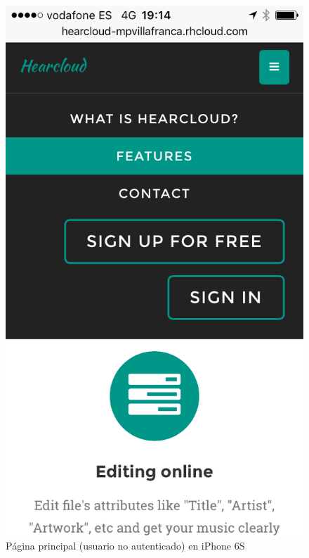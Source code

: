 \begin{figure}[H]
  \includegraphics[width=\linewidth]{../images/um/um_10.png}
  \caption{Página principal (usuario no autenticado) en iPhone 6S}
\endminipage\hfill
{}

\end{figure}
